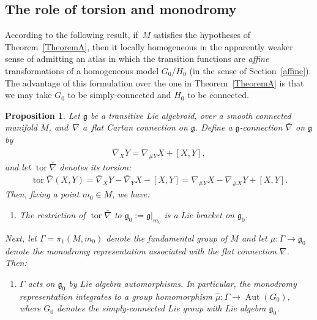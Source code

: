 \documentclass[pdftex]{sigma}
\DeclareMathOperator{\automorphism}{Aut}
\DeclareMathOperator{\torsion}{tor}
\numberwithin{equation}{section}
\newtheorem{PropositionBlaom}[TheoremBlaom]{Proposition}
 { \theoremstyle{definition}
\newtheorem{CounterexampleBlaom}[TheoremBlaom]{Counterexample}
\newtheorem{RemarkBlaom}[TheoremBlaom]{Remark} }
\begin{document}
\subsection{The role of torsion and monodromy}\label{rolltorsion}
According to the following result, if~$M$ satisf\/ies the hypotheses of
Theorem~\ref{TheoremA}, then it locally homogeneous in the apparently weaker sense
of admitting an atlas in which the transition functions are {\em
  affine} transformations of a homogeneous model $G_0/H_0$ (in the
sense of Section~\ref{affine}). The advantage of this formulation over the one
in Theorem~\ref{TheoremA} is that we may take $G_0$ to be simply-connected and
$H_0$ to be connected.

\begin{PropositionBlaom}\label{Proposition5.1}
  Let $\mathfrak g$ be a transitive Lie algebroid, over a smooth
  connected manifold $M$, and~$\nabla $ a~flat Cartan connection on
  $\mathfrak g$. Define a ${\mathfrak g}$-connection $\bar\nabla$ on
  $\mathfrak g$ by
  \begin{gather*}
    \bar\nabla_XY=\nabla_{\#Y}X+[X,Y],
  \end{gather*}
  and let $\torsion \bar\nabla $ denotes its torsion:
  \begin{gather*}
    \torsion \bar\nabla (X,Y)=\bar\nabla_XY-\bar\nabla_YX-[X,Y]=\nabla_{\#Y}X-\nabla_{\#X}Y+[X,Y].
  \end{gather*}
  Then, fixing a point $m_0 \in M$, we have:
  \begin{enumerate}\itemsep=0pt
  \item[$(1)$]  %
  The restriction of $\torsion \bar\nabla$ to ${\mathfrak
      g}_0:={\mathfrak g}|_{m_0}$ is a Lie bracket on ${\mathfrak
      g}_0$.
  \end{enumerate}

  Next, let $\Gamma=\pi_1(M,m_0)$ denote the fundamental group of $M$
  and let $\mu \colon \Gamma \rightarrow {\mathfrak g}_0$ denote the
  monodromy representation associated with the flat connection
  $\nabla$. Then:
  \begin{enumerate}\itemsep=0pt
  \item[$(2)$] %
  $\Gamma$ acts on ${\mathfrak g}_0$ by Lie algebra
    automorphisms. In particular, the monodromy representation
    integrates to a group homomorphism $\hat\mu \colon \Gamma
    \rightarrow \automorphism(G_0)$, where $G_0$ denotes the
    simply-connected Lie group with Lie algebra ${\mathfrak g}_0 $.
  \end{enumerate}


\end{PropositionBlaom}
\end{document}
